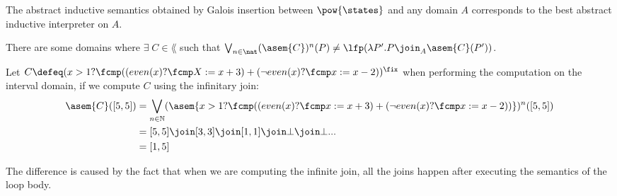 The abstract inductive semantics obtained by Galois insertion between 
$\pow{\states}$ and any domain $A$ corresponds to the best abstract inductive 
interpreter on $A$.

\begin{observation}
  \label{obs:abstract-fix}
  There are some domains where $\exists \; C \in \lang$ such that
  $\bigvee_{n \in \nat} (\asem{C})^n(P) \neq \lfp(\lambda P'. P \join_A
  \asem{C}(P'))$.
\end{observation}
\begin{example}
  Let $C \defeq (x > 1? \fcmp ((even(x) ? \fcmp X := x + 3) +
  (\neg even(x)? \fcmp x := x - 2))^\fix$ when performing the computation on
  the interval domain, if we compute $C$ using the infinitary join:
  \begin{align*}
    \asem{C}([5, 5])
      &= \bigvee_{n \in \mathbb{N}} (\asem{x > 1? \fcmp ((even(x) ? \fcmp x :=
        x + 3) + (\neg even(x)? \fcmp x := x - 2))})^n([5, 5]) \\
      &= [5, 5] \join [3, 3] \join [1, 1] \join \bot \join \bot ... \\
      &= [1, 5]
  \end{align*}

  The difference is caused by the fact that when we are computing the infinite 
  join, all the joins happen after executing the semantics of the loop body.
  
\end{example}
